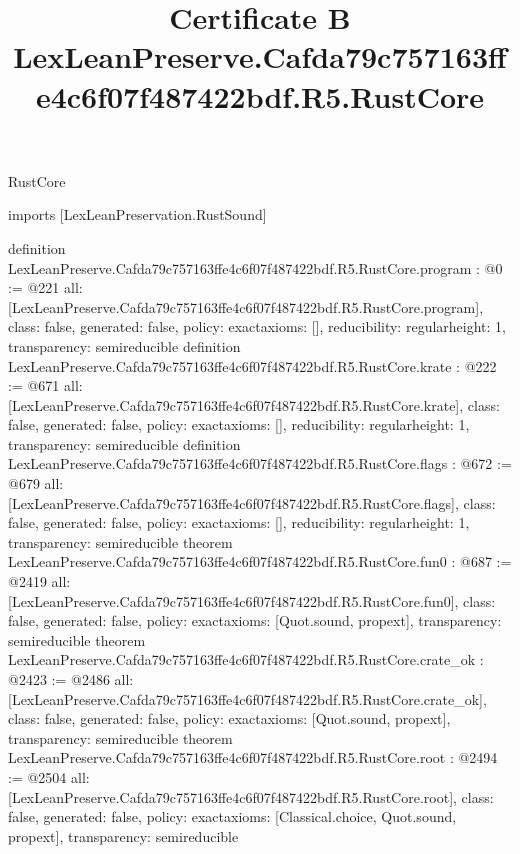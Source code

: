 \begin{lexlean}{RustCore}
\title{Certificate B LexLeanPreserve.Cafda79c757163ffe4c6f07f487422bdf.R5.RustCore}
\begin{coremodule}
imports [LexLeanPreservation.RustSound]

definition LexLeanPreserve.Cafda79c757163ffe4c6f07f487422bdf.R5.RustCore.program : @0 := @221 {
  all: [LexLeanPreserve.Cafda79c757163ffe4c6f07f487422bdf.R5.RustCore.program],
  class: false,
  generated: false,
  policy: exact{axioms: []},
  reducibility: regular{height: 1},
  transparency: semireducible
}
definition LexLeanPreserve.Cafda79c757163ffe4c6f07f487422bdf.R5.RustCore.krate : @222 := @671 {
  all: [LexLeanPreserve.Cafda79c757163ffe4c6f07f487422bdf.R5.RustCore.krate],
  class: false,
  generated: false,
  policy: exact{axioms: []},
  reducibility: regular{height: 1},
  transparency: semireducible
}
definition LexLeanPreserve.Cafda79c757163ffe4c6f07f487422bdf.R5.RustCore.flags : @672 := @679 {
  all: [LexLeanPreserve.Cafda79c757163ffe4c6f07f487422bdf.R5.RustCore.flags],
  class: false,
  generated: false,
  policy: exact{axioms: []},
  reducibility: regular{height: 1},
  transparency: semireducible
}
theorem LexLeanPreserve.Cafda79c757163ffe4c6f07f487422bdf.R5.RustCore.fun0 : @687 := @2419 {
  all: [LexLeanPreserve.Cafda79c757163ffe4c6f07f487422bdf.R5.RustCore.fun0],
  class: false,
  generated: false,
  policy: exact{axioms: [Quot.sound, propext]},
  transparency: semireducible
}
theorem LexLeanPreserve.Cafda79c757163ffe4c6f07f487422bdf.R5.RustCore.crate_ok : @2423 := @2486 {
  all: [LexLeanPreserve.Cafda79c757163ffe4c6f07f487422bdf.R5.RustCore.crate_ok],
  class: false,
  generated: false,
  policy: exact{axioms: [Quot.sound, propext]},
  transparency: semireducible
}
theorem LexLeanPreserve.Cafda79c757163ffe4c6f07f487422bdf.R5.RustCore.root : @2494 := @2504 {
  all: [LexLeanPreserve.Cafda79c757163ffe4c6f07f487422bdf.R5.RustCore.root],
  class: false,
  generated: false,
  policy: exact{axioms: [Classical.choice, Quot.sound, propext]},
  transparency: semireducible
}


\end{coremodule}
\end{lexlean}
